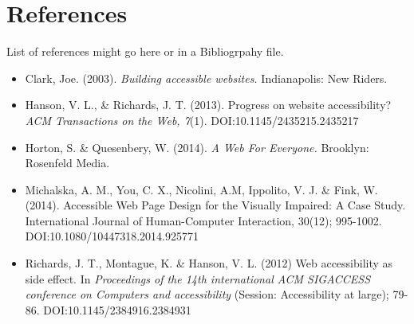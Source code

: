 \documentclass{acm_proc_article-sp}
\begin{document}
\section{References}
List of references might go here or in a Bibliogrpahy file.
\begin{itemize}
\item Clark, Joe. (2003). {\it Building accessible websites.} Indianapolis: New Riders.
\item Hanson, V. L., \& Richards, J. T. (2013). Progress on website accessibility? {\it ACM Transactions on the Web, 7}(1). DOI:10.1145/2435215.2435217
\item Horton, S. \& Quesenbery, W. (2014). {\it A Web For Everyone.} Brooklyn: Rosenfeld Media.
\item Michalska, A. M., You, C. X., Nicolini, A.M, Ippolito, V. J. \& Fink, W. (2014).  Accessible Web Page Design for the Visually Impaired: A Case Study. International Journal of Human-Computer Interaction, 30(12); 995-1002. DOI:10.1080/10447318.2014.925771
\item Richards, J. T., Montague, K. \& Hanson, V. L. (2012) Web accessibility as side effect. In {\it Proceedings of the 14th international ACM SIGACCESS conference on Computers and accessibility} (Session: Accessibility at large); 79-86. DOI:10.1145/2384916.2384931
\end{itemize}
%
\end{document}
